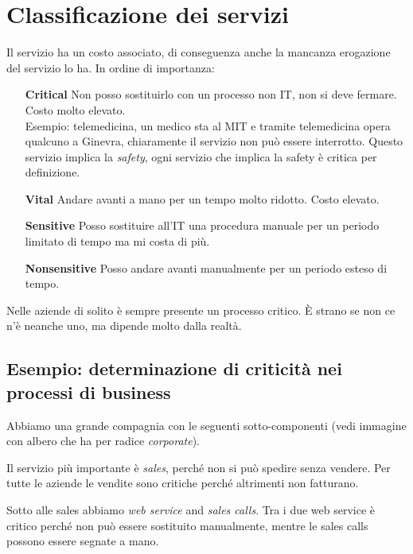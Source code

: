 \section{Classificazione dei servizi}

Il servizio ha un costo associato, di conseguenza anche la mancanza erogazione 
del servizio lo ha. In ordine di importanza:
\begin{enumerate}
 \item[\textbf{Critical}] Non posso sostituirlo con un processo non IT, non si 
deve fermare. Costo molto elevato. \\
Esempio: telemedicina, un medico sta al MIT 
e tramite telemedicina opera qualcuno a Ginevra, chiaramente il servizio non 
può essere interrotto. Questo servizio implica la \textit{safety}, ogni 
servizio che implica la safety è critica per definizione.

 \item[\textbf{Vital}] Andare avanti a mano per un tempo molto ridotto. Costo 
elevato.

 \item[\textbf{Sensitive}] Posso sostituire all'IT una procedura manuale per un 
periodo limitato di tempo ma mi costa di più. 

 \item[\textbf{Nonsensitive}] Posso andare avanti manualmente per un periodo 
esteso di tempo. 

\end{enumerate}

Nelle aziende di solito è sempre presente un processo critico. È strano se non 
ce n'è neanche uno, ma dipende molto dalla realtà.

\subsection{Esempio: determinazione di criticità nei processi di business}

Abbiamo una grande compagnia con le seguenti sotto-componenti (vedi immagine 
con albero che ha per radice \textit{corporate}).

Il servizio più importante è \textit{sales}, perché non si può spedire senza 
vendere. Per tutte le aziende le vendite sono critiche perché altrimenti non 
fatturano.

Sotto alle sales abbiamo \textit{web service} and \textit{sales calls}. Tra i 
due web service è critico perché non può essere sostituito manualmente, mentre 
le sales calls possono essere segnate a mano.

